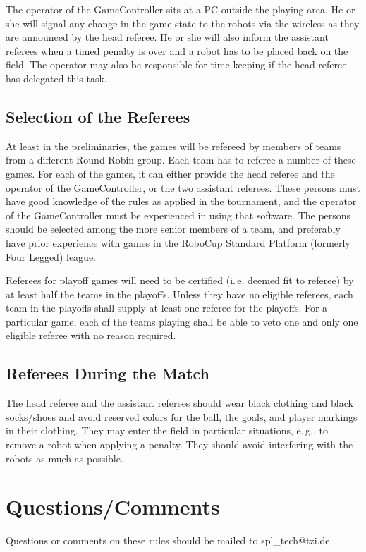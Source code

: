 \documentclass[12pt]{article}
\newcommand{\ie}{\mbox{i.\,e.}\xspace}
\newcommand{\eg}{\mbox{e.\,g.}\xspace}
\begin{document}
The operator of the GameController sits at a PC outside the playing
area. He or she will signal any change in the game state to the
robots via the wireless as they are announced by the head referee.
He or she will also inform the assistant referees when a timed
penalty is over and a robot has to be placed back on the field. The
operator may also be responsible for time keeping if the head
referee has delegated this task.

\subsection{Selection of the Referees}

At least in the preliminaries, the games will be refereed by members
of teams from a different Round-Robin group. Each team has to
referee a number of these games. For each of the games, it can
either provide the head referee and the operator of the
GameController, or the two assistant referees. These persons must
have good knowledge of the rules as applied in the tournament, and
the operator of the GameController must be experienced in using that
software. The persons should be selected among the more senior
members of a team, and preferably have prior experience with games
in the RoboCup Standard Platform (formerly Four Legged) league.

Referees for playoff games will need to be certified (\ie deemed fit to referee)
by at least half the teams in the playoffs. Unless they have no eligible referees,
each team in the playoffs shall supply at least one referee for the playoffs.
For a particular game, each of the teams playing shall be able to veto one
and only one eligible referee with no reason required.

\subsection{Referees During the Match}

The head referee and the assistant referees should wear black
clothing and black socks/shoes and avoid reserved colors for the
ball, the goals, and player markings in their clothing. They may
enter the field in particular situations, \eg, to remove a robot
when applying a penalty. They should avoid interfering with the
robots as much as possible.

\section{Questions/Comments}

Questions or comments on these rules should be mailed to
spl\_tech@tzi.de
\end{document}

